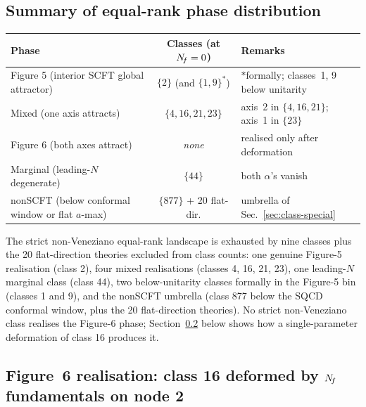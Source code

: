 \subsection{Summary of equal-rank phase distribution}
\label{sec:phases-summary}

\begin{center}
  \begin{tabular}{lcl}
    \toprule
    Phase & Classes (at $N_{\!f}=0$) & Remarks \\
    \midrule
    Figure 5 (interior SCFT global attractor) & $\{2\}$ (and $\{1,9\}^{\ast}$)
                                              & $\ast$formally; classes~1, 9 below unitarity \\
    Mixed (one axis attracts)                 & $\{4,16,21,23\}$
                                              & axis~2 in $\{4,16,21\}$; axis~1 in $\{23\}$ \\
    Figure 6 (both axes attract)              & \emph{none}
                                              & realised only after deformation \\
    Marginal (leading-$N$ degenerate)         & $\{44\}$
                                              & both $\alpha$'s vanish \\
    nonSCFT (below conformal window or flat $a$-max) & $\{877\}$ + 20 flat-dir.
                                              & umbrella of Sec.~\ref{sec:class-special} \\
    \bottomrule
  \end{tabular}
\end{center}

The strict non-Veneziano equal-rank landscape is exhausted by nine
classes plus the 20 flat-direction theories excluded from class
counts: one genuine Figure-5 realisation (class 2), four mixed
realisations (classes 4, 16, 21, 23), one leading-$N$ marginal class
(class 44), two below-unitarity classes formally in the Figure-5 bin
(classes 1 and 9), and the nonSCFT umbrella (class 877 below the SQCD
conformal window, plus the 20 flat-direction theories).  No strict
non-Veneziano class realises the Figure-6 phase;
Section~\ref{sec:phases-class16} below shows how a single-parameter
deformation of class 16 produces it.

\subsection{Figure~6 realisation: class 16 deformed by $N_{\!f}$
  fundamentals on node 2}
\label{sec:phases-class16}

